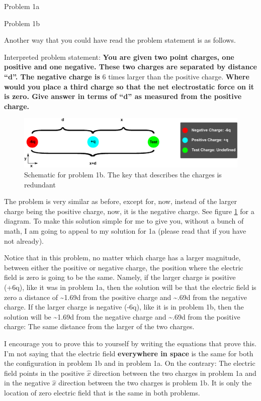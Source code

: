 \begin{homeworkProblem}
\begin{homeworkSection}{Problem 1a}
\end{homeworkSection}
\begin{homeworkSection}{Problem 1b}

Another way that you could have read the problem statement is as follows.

Interpreted problem statement: \textbf{You are given two point charges, one positive and one negative. These two charges are separated by distance ``d''. The negative charge is} 6 times larger than the positive charge. \textbf{Where would you place a third charge so that the net electrostatic force on it is zero. Give answer in terms of ``d'' as measured from the positive charge.}

\begin{figure}%
\centering
\includegraphics[width=\columnwidth]{1b.eps}%
\caption{Schematic for problem 1b. The key that describes the charges is redundant}%
\label{fig:1b.eps}%
\end{figure}

The problem is very similar as before, except for, now, instead of the larger charge being the positive charge, now, it is the negative charge. See figure \ref{fig:1b.eps} for a diagram. To make this solution simple for me to give you, without a bunch of math, I am going to appeal to my solution for 1a (please read that if you have not already).

Notice that in this problem, no matter which charge has a larger magnitude, between either the positive or negative charge, the position where the electric field is zero is going to be the same. Namely, if the larger charge is positive (+6q), like it was in problem 1a, then the solution will be that the electric field is zero a distance of \textasciitilde1.69d from the positive charge and \textasciitilde.69d from the negative charge. If the larger charge is negative (-6q), like it is in problem 1b, then the solution will be \textasciitilde1.69d from the negative charge and \textasciitilde.69d from the positive charge: The same distance from the larger of the two charges.

I encourage you to prove this to yourself by writing the equations that prove this. I'm not saying that the electric field \textbf{everywhere in space} is the same for both the configuration in problem 1b and in problem 1a. On the contrary: The electric field points in the positive $\hat{x}$ direction between the two charges in problem 1a and in the negative $\hat{x}$ direction between the two charges is problem 1b. It is only the location of zero electric field that is the same in both problems.


\end{homeworkSection}
\end{homeworkProblem}
